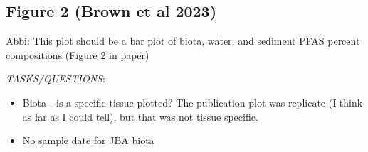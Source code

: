 \documentclass[
]{article}
\newenvironment{Shaded}{\begin{snugshade}}{\end{snugshade}}
\newcommand{\CommentTok}[1]{\textcolor[rgb]{0.56,0.35,0.01}{\textit{#1}}}
\newcommand{\DecValTok}[1]{\textcolor[rgb]{0.00,0.00,0.81}{#1}}
\newcommand{\FunctionTok}[1]{\textcolor[rgb]{0.13,0.29,0.53}{\textbf{#1}}}
\newcommand{\NormalTok}[1]{#1}
\newcommand{\OtherTok}[1]{\textcolor[rgb]{0.56,0.35,0.01}{#1}}
\newcommand{\SpecialCharTok}[1]{\textcolor[rgb]{0.81,0.36,0.00}{\textbf{#1}}}
\newcommand{\StringTok}[1]{\textcolor[rgb]{0.31,0.60,0.02}{#1}}
\providecommand{\tightlist}{%
  \setlength{\itemsep}{0pt}\setlength{\parskip}{0pt}}
\begin{document}
\begin{Shaded}
\end{Shaded}

\subsection{Figure 2 (Brown et al
2023)}\label{figure-2-brown-et-al-2023}

Abbi: This plot should be a bar plot of biota, water, and sediment PFAS
percent compositions (Figure 2 in paper)

\emph{TASKS/QUESTIONS}:

\begin{itemize}
\tightlist
\item
  Biota - is a specific tissue plotted? The publication plot was
  replicate (I think as far as I could tell), but that was not tissue
  specific.
\item
  No sample date for JBA biota
\end{itemize}
\end{document}
